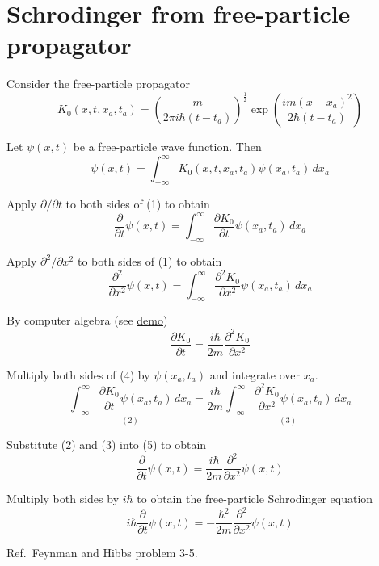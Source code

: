 

\section*{Schrodinger from free-particle propagator}

Consider the free-particle propagator
\begin{equation*}
K_0(x,t,x_a,t_a)=\left(\frac{m}{2\pi i\hbar(t-t_a)}\right)^\frac{1}{2}
\exp\left(\frac{im(x-x_a)^2}{2\hbar(t-t_a)}\right)
\end{equation*}

Let $\psi(x,t)$ be a free-particle wave function.
Then
\begin{equation*}
\psi(x,t)=\int_{-\infty}^\infty K_0(x,t,x_a,t_a)\psi(x_a,t_a)\,dx_a
\tag{1}
\end{equation*}

Apply $\partial/\partial t$ to both sides of (1) to obtain
\begin{equation*}
\frac{\partial}{\partial t}\psi(x,t)
=\int_{-\infty}^\infty\frac{\partial K_0}{\partial t}
\psi(x_a,t_a)\,dx_a
\tag{2}
\end{equation*}

Apply $\partial^2/\partial x^2$ to both sides of (1) to obtain
\begin{equation*}
\frac{\partial^2}{\partial x^2}\psi(x,t)
=\int_{-\infty}^\infty\frac{\partial^2 K_0}{\partial x^2}
\psi(x_a,t_a)\,dx_a
\tag{3}
\end{equation*}

By computer algebra (see \href{https://georgeweigt.github.io/blog/09.html}{demo})
\begin{equation*}
\frac{\partial K_0}{\partial t}
=\frac{i\hbar}{2m}\frac{\partial^2K_0}{\partial x^2}
\tag{4}
\end{equation*}

Multiply both sides of (4) by $\psi(x_a,t_a)$ and integrate over $x_a$.
\begin{equation*}
\underset{(2)}{\int_{-\infty}^\infty\frac{\partial K_0}{\partial t}\psi(x_a,t_a)\,dx_a}
=\frac{i\hbar}{2m}\underset{(3)}
{\int_{-\infty}^\infty\frac{\partial^2K_0}{\partial x^2}
\psi(x_a,t_a)\,dx_a}
\tag{5}
\end{equation*}

Substitute (2) and (3) into (5) to obtain
\begin{equation*}
\frac{\partial}{\partial t}\psi(x,t)
=\frac{i\hbar}{2m}\frac{\partial^2}{\partial x^2}\psi(x,t)
\end{equation*}

Multiply both sides by $i\hbar$ to obtain the free-particle Schrodinger equation
\begin{equation*}
i\hbar\frac{\partial}{\partial t}\psi(x,t)
=-\frac{\hbar^2}{2m}\frac{\partial^2}{\partial x^2}\psi(x,t)
\end{equation*}

Ref.~Feynman and Hibbs problem 3-5.

